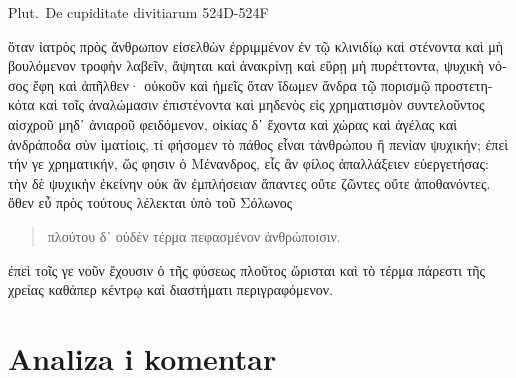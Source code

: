 Plut.\ De cupiditate divitiarum 524D-524F


\medskip


{\large

\begin{greek}

\noindent ὅταν ἰατρὸς πρὸς ἄνθρωπον εἰσελθὼν ἐρριμμένον ἐν τῷ κλινιδίῳ καὶ στένοντα καὶ μὴ βουλόμενον τροφὴν λαβεῖν, ἅψηται καὶ ἀνακρίνῃ καὶ εὕρῃ μὴ πυρέττοντα, ψυχικὴ νόσος ἔφη καὶ ἀπῆλθεν· οὐκοῦν καὶ ἡμεῖς ὅταν ἴδωμεν ἄνδρα τῷ πορισμῷ προστετηκότα καὶ τοῖς ἀναλώμασιν ἐπιστένοντα καὶ μηδενὸς εἰς χρηματισμὸν συντελοῦντος αἰσχροῦ μηδ᾽ ἀνιαροῦ φειδόμενον, οἰκίας δ᾽ ἔχοντα καὶ χώρας καὶ ἀγέλας καὶ ἀνδράποδα σὺν ἱματίοις, τί φήσομεν τὸ πάθος εἶναι τἀνθρώπου ἢ πενίαν ψυχικήν; ἐπεὶ τήν γε χρηματικήν, ὥς φησιν ὁ Μένανδρος, εἷς ἂν φίλος ἀπαλλάξειεν εὐεργετήσας: τὴν δὲ ψυχικὴν ἐκείνην οὐκ ἂν ἐμπλήσειαν ἅπαντες οὔτε ζῶντες οὔτε ἀποθανόντες. ὅθεν εὖ πρὸς τούτους λέλεκται ὑπὸ τοῦ Σόλωνος 
\begin{verse}
πλούτου δ᾽ οὐδὲν τέρμα πεφασμένον ἀνθρώποισιν.
\end{verse}
ἐπεὶ τοῖς γε νοῦν ἔχουσιν ὁ τῆς φύσεως πλοῦτος ὥρισται καὶ τὸ τέρμα πάρεστι τῆς χρείας καθάπερ κέντρῳ καὶ διαστήματι περιγραφόμενον.

\end{greek}

}


\section*{Analiza i komentar}


